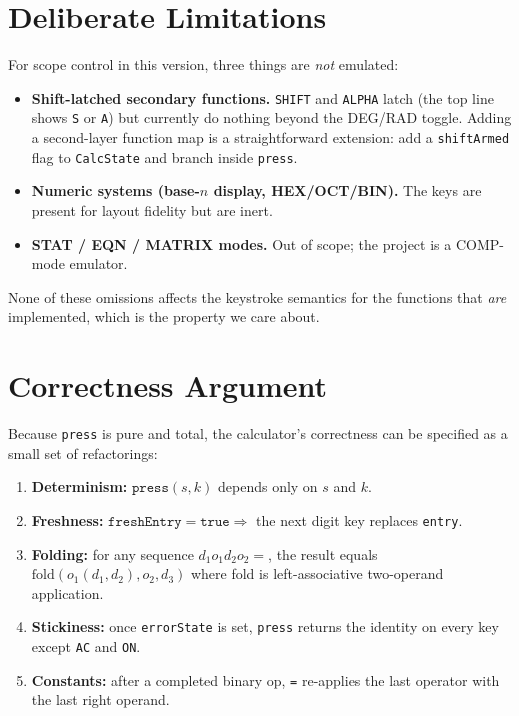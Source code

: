 \documentclass[11pt,a4paper]{article}
\begin{document}
\section{Deliberate Limitations}

For scope control in this version, three things are \emph{not} emulated:

\begin{itemize}[leftmargin=*,itemsep=2pt]
    \item \textbf{Shift-latched secondary functions.} \texttt{SHIFT} and \texttt{ALPHA} latch (the top line shows \texttt{S} or \texttt{A}) but currently do nothing beyond the DEG/RAD toggle. Adding a second-layer function map is a straightforward extension: add a \texttt{shiftArmed} flag to \texttt{CalcState} and branch inside \texttt{press}.
    \item \textbf{Numeric systems (base-$n$ display, HEX/OCT/BIN).} The keys are present for layout fidelity but are inert.
    \item \textbf{STAT / EQN / MATRIX modes.} Out of scope; the project is a COMP-mode emulator.
\end{itemize}

None of these omissions affects the keystroke semantics for the functions that \emph{are} implemented, which is the property we care about.

\section{Correctness Argument}

Because \texttt{press} is pure and total, the calculator's correctness can be specified as a small set of refactorings:

\begin{enumerate}[leftmargin=*,itemsep=2pt]
    \item \textbf{Determinism:} $\texttt{press}(s,k)$ depends only on $s$ and $k$.
    \item \textbf{Freshness:} $\texttt{freshEntry} = \texttt{true} \Rightarrow$ the next digit key replaces \texttt{entry}.
    \item \textbf{Folding:} for any sequence $d_1 o_1 d_2 o_2 = $, the result equals $\mathrm{fold}(o_1(d_1,d_2), o_2, d_3)$ where fold is left-associative two-operand application.
    \item \textbf{Stickiness:} once \texttt{errorState} is set, \texttt{press} returns the identity on every key except \texttt{AC} and \texttt{ON}.
    \item \textbf{Constants:} after a completed binary op, \texttt{=} re-applies the last operator with the last right operand.
\end{enumerate}
\end{document}
